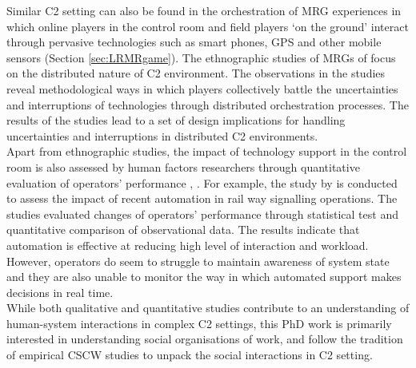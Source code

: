 Similar \ac{C2} setting can also be found in the orchestration of \acf{MRG} experiences in which online players in the control room and field players `on the ground' interact through pervasive technologies such as smart phones, GPS and other mobile sensors (Section \ref{sec:LRMRgame}). The ethnographic studies of \ac{MRG}s of \cite{Benford2006,Crabtree2004,Koleva2001} focus on the distributed nature of \ac{C2} environment. The observations in the studies reveal methodological ways in which players collectively battle the uncertainties and interruptions of technologies through distributed orchestration processes. The results of the studies lead to a set of design implications for handling uncertainties and interruptions in distributed \ac{C2} environments. \\

Apart from ethnographic studies, the impact of technology support in the control room is also assessed by human factors researchers through quantitative evaluation of operators' performance \citep{Grootjen2007}, \citep{Sharples2011}. For example, the study by \cite{Sharples2011} is conducted to assess the impact of recent automation in rail way signalling operations. The studies evaluated changes of operators' performance through statistical test and quantitative comparison of observational data. The results indicate that automation is effective at reducing high level of interaction and workload. However, operators do seem to struggle to maintain awareness of system state and they are also unable to monitor the way in which automated support makes decisions in real time. \\

While both qualitative and quantitative studies contribute to an understanding of human-system interactions in complex \ac{C2} settings, this PhD work is primarily interested in understanding social organisations of work, and follow the tradition of empirical \ac{CSCW} studies to unpack the social interactions in \ac{C2} setting. \\



